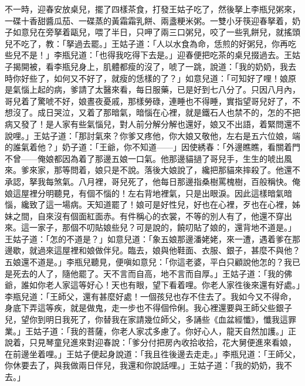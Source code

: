 不一時，迎春安放桌兒，擺了四樣茶食，打發王姑子吃了，然後拏上李瓶兒粥來，一碟十香甜醬瓜茄、一碟蒸的黃霜霜乳餅、兩盞粳米粥。一雙小牙筷迎春拏着，奶子如意兒在旁拏着甌兒，喂了半日，只呷了兩三口粥兒，咬了一些乳餅兒，就搖頭兒不吃了，教：「拏過去罷。」王姑子道：「人以水食為命，恁煎的好粥兒，你再吃些兒不是！」李瓶兒道：「也得我吃得下去是。」迎春便把吃茶的桌兒掇過去。王姑子揭開被，看李瓶兒身上，肌體都瘦的沒了，唬了一跳，說道：「我的奶奶，我去時你好些了，如何又不好了，就瘦的恁樣的了？」如意兒道：「可知好了哩！娘原是氣惱上起的病，爹請了太醫來看，每日服藥，已是好到七八分了。只因八月內，哥兒着了驚唬不好，娘晝夜憂戚，那樣勞碌，連睡也不得睡，實指望哥兒好了，不想沒了。成日哭泣，又着了那暗氣，暗惱在心裡，就是鐵石人也禁不的，怎的不把病又發了！是人家有些氣惱兒，對人前分解分解也還好，娘又不出語，着緊問還不說哩。」{}王姑子道：「那討氣來？你爹又疼他，你大娘又敬他，左右是五六位娘，端的誰氣着他？」奶子道：「王爺，你不知道——」因使綉春：「外邊瞧瞧，{}看關着門不曾——俺娘都因為着了那邊五娘一口氣。他那邊貓撾了哥兒手，生生的唬出風來。爹來家，那等問着，娘只是不說。落後大娘說了，纔把那貓來摔殺了。他還不承認，拏我每煞氣。八月裡，哥兒死了，他每日那邊指桑樹罵槐樹，百般稱快。俺娘這屋裡分明聽見，有個不惱的！左右背地裡氣，只是出眼淚。因此這樣暗氣暗惱，纔致了這一場病。天知道罷了！娘可是好性兒，好也在心裡，歹也在心裡，姊妹之間，自來沒有個面紅面赤。有件稱心的衣裳，不等的別人有了，他還不穿出來。這一家子，那個不叨貼娘些兒？可是說的，饒叨貼了娘的，還背地不道是。」{}王姑子道：「怎的不道是？」如意兒道：「象五娘那邊潘姥姥，來一遭，遇着爹在那邊歇，就過來這屋裡和娘做伴兒。臨去，娘與他鞋面、衣服、銀子，甚麼不與他？五娘還不道是。」李瓶兒聽見，便嗔如意兒：「你這老婆，平白只顧說他怎的？我已是死去的人了，隨他罷了。天不言而自高，地不言而自厚。」{}王姑子道：「我的佛爺，誰如你老人家這等好心！天也有眼，望下看着哩。你老人家徃後來還有好處。」李瓶兒道：「王師父，還有甚麼好處！一個孩兒也存不住去了。我如今又不得命，身底下弄這等疾，就是做鬼，走一步也不得個伶俐。我心裡還要與王師父些銀子兒，望你到明日我死了，你替我在家請幾位師父，多誦些《血盆經懺》，懺我這罪業。」王姑子道：「我的菩薩，你老人家忒多慮了。你好心人，龍天自然加護。」正說着，只見琴童兒進來對迎春說：「爹分付把房內收拾收拾，花大舅便進來看娘，在前邊坐着哩。」王姑子便起身說道：「我且徃後邊去走走。」李瓶兒道：「王師父，你休要去了，與我做兩日伴兒，我還和你說話哩。」王姑子道：「我的奶奶，我不去。」

